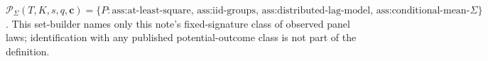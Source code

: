 \(\mathcal P_\Sigma(T,K,s,q,\mathbf c)=\{P:\text{ass:at-least-square, ass:iid-groups, ass:distributed-lag-model, ass:conditional-mean-zero, ass:stayer-mass, ass:mover-density, ass:density-envelope, ass:fixed-signature-support, ass:normal-link-certificate, ass:q-moments, ass:noise-variance, and ass:frontier-holder hold for the fixed }\Sigma\}\). This set-builder names only this note's fixed-signature class of observed panel laws; identification with any published potential-outcome class is not part of the definition.